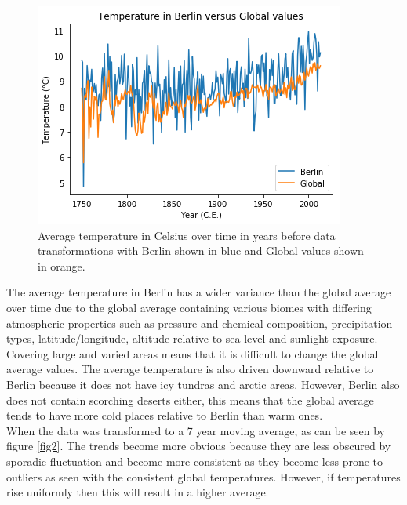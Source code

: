 \documentclass[journal, a4paper]{IEEEtran}
\begin{document}
	\begin{figure}[tbh]
		\begin{center}
		\includegraphics[width=\columnwidth]{Plots/MovingAverageTemperaturePlot_001year.png}
		\caption{Average temperature in Celsius over time in years before data transformations with Berlin shown in blue and Global values shown in orange.}
		\label{fig1}
		\end{center}
	\end{figure}

    The average temperature in Berlin has a wider variance than the global average over time due to the global average containing various biomes with differing atmospheric properties such as pressure and chemical composition, precipitation types, latitude/longitude, altitude relative to sea level and sunlight exposure. Covering large and varied areas means that it is difficult to change the global average values. The average temperature is also driven downward relative to Berlin because it does not have icy tundras and arctic areas. However, Berlin also does not contain scorching deserts either, this means that the global average tends to have more cold places relative to Berlin than warm ones.\\

    When the data was transformed to a 7 year moving average, as can be seen by figure \ref{fig2}. The trends become more obvious because they are less obscured by sporadic fluctuation and become more consistent as they become less prone to outliers as seen with the consistent global temperatures. However, if temperatures rise uniformly then this will result in a higher average.\\
\end{document}
